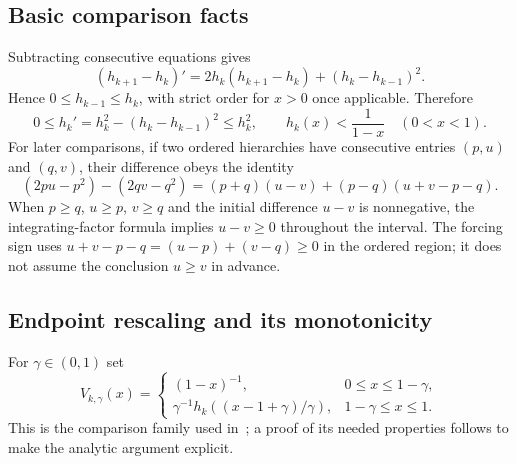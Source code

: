 \documentclass[11pt,a4paper]{article}
\theoremstyle{remark}\newtheorem{remark}[theorem]{Remark}
\begin{document}
\subsection{Basic comparison facts}
Subtracting consecutive equations gives
\[
(h_{k+1}-h_k)'=2h_k(h_{k+1}-h_k)+(h_k-h_{k-1})^2.
\]
Hence $0\le h_{k-1}\le h_k$, with strict order for $x>0$ once applicable. Therefore
\begin{equation}\label{eq:basic}
0\le h_k'=h_k^2-(h_k-h_{k-1})^2\le h_k^2,
\qquad h_k(x)<\frac1{1-x}\quad(0<x<1).
\end{equation}
For later comparisons, if two ordered hierarchies have consecutive entries $(p,u)$ and $(q,v)$, their difference obeys the identity
\begin{equation}\label{eq:comparison}
(2pu-p^2)-(2qv-q^2)
=(p+q)(u-v)+(p-q)(u+v-p-q).
\end{equation}
When $p\ge q$, $u\ge p$, $v\ge q$ and the initial difference $u-v$ is nonnegative, the integrating-factor formula implies $u-v\ge0$ throughout the interval.
The forcing sign uses $u+v-p-q=(u-p)+(v-q)\ge0$ in the ordered region; it does not assume the conclusion $u\ge v$ in advance.

\subsection{Endpoint rescaling and its monotonicity}
For $\gamma\in(0,1)$ set
\[
V_{k,\gamma}(x)=
\begin{cases}
(1-x)^{-1},&0\le x\le1-\gamma,\\
\gamma^{-1}h_k((x-1+\gamma)/\gamma),&1-\gamma\le x\le1.
\end{cases}
\]
This is the comparison family used in~\cite{KZ2017,KZ2020}; a proof of its needed properties follows to make the analytic argument explicit.
\end{document}
